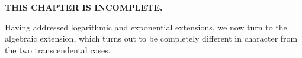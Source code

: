 

{\bf THIS CHAPTER IS INCOMPLETE.}

Having addressed logarithmic and exponential extensions, we now turn
to the algebraic extension, which turns out to be completely different
in character from the two transcendental cases.

\begin{comment}

To justify that statement, let's begin by trying to attack algebraic
extensions in the same manner as the two transcendental cases.

$$(\sum_i a_i \theta^i)' = \sum_i ( a_i' \theta^i + a_i (\theta^{i})')$$

Presumably, we know how to differentiate $\theta$, so let's write
$(\theta^i)' = \sum_j \psi_{i,j} \theta^j$:

$$(\sum_i a_i \theta^i)' = \sum_i ( a_i' \theta^i + a_i \sum_j \psi_{i,j} \theta^j)$$

Writing the $a_i$'s as a column vector $A$, we'll end up with a matrix equation:

$$I = A' + \Psi A$$

This is superficially similar to a Risch equation; it's a matrix Risch
equation.  To proceed in the same manner as before, we'd now have to
construct partial fractions expansions of everything and begin looking
at how cancellation might occur between our various components.  The
variety of possible cancelations between our terms seems daunting.

\vfill\eject

$$\int y\,dx \qquad y^2 = 4-x^2$$

Let's assume that our solution has the form $S = ay+b+\ln (cy+d)$, where $a$
and $b$ are rational functions in $x$ and $c$ is a polynomial in $x$.

$$S' = a' y + a y' + b' + \frac{c'y+cy'+d'}{cy+d}$$
$$2 y y' = -2x \qquad y' = -\frac{x}{y} = - \frac{x}{4-x^2}y$$
$$S' = y = (a' - a \frac{x}{4-x^2})y + b' + \frac{(c' - c \frac{x}{4-x^2})y+d}{cy+d}$$
$$S' = y = (a' - a \frac{x}{4-x^2})y + b' + \frac{(c' - c \frac{x}{4-x^2})y+d}{cy+d}\frac{cy-d}{cy-d}$$
$$S' = y = (a' - a \frac{x}{4-x^2})y + b' + \frac{(c' - c \frac{x}{4-x^2})cy^2+cdy -(c' - c \frac{x}{4-x^2})dy-d^2}{c^2y^2-d^2}$$
$$S' = y = (a' - a \frac{x}{4-x^2})y + b' + \frac{(c' - c \frac{x}{4-x^2})c(4-x^2)+cdy -(c' - c \frac{x}{4-x^2})dy-d^2}{c^2(4-x^2)-d^2}$$
$$S' = y = (a' - a \frac{x}{4-x^2})y + b' + \frac{(c'(4-x^2) - c x)c+cdy -(c' - c \frac{x}{4-x^2})dy-d^2}{c^2(4-x^2)-d^2}$$
$$S' = y = (a' - a \frac{x}{4-x^2} + \frac{cd-(c' - c \frac{x}{4-x^2})d}{c^2(4-x^2)-d^2})y + b' + \frac{(c'(4-x^2) - c x)c -d^2}{c^2(4-x^2)-d^2}$$


The correct answer is

$$S = 2i\ln(ix-y)+\frac{x}{2}y$$

Instead, we'll use a different approach...

\vfill\eject

\end{comment}

